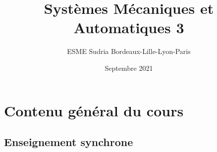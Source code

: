 \documentclass[a4paper,11pt]{article}
\title{Systèmes Mécaniques et Automatiques 3}
\date{Septembre 2021}
\author{ESME Sudria Bordeaux-Lille-Lyon-Paris}
\begin{document}
\maketitle

\section*{Contenu général du cours}

\subsection*{Enseignement synchrone}
\end{document}

